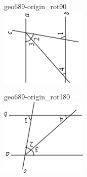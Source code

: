 \documentclass[12pt]{article}
\begin{document}
\begin{center}
\begin{minipage}{0.32\textwidth}
\end{minipage}
\hfill\begin{minipage}{0.32\textwidth}\centering
geo689-origin\_rot90\\
\includegraphics[width=0.95\linewidth]{out_rommath_origin/items/geo689-origin/assets/figure_rot90.png}
\end{minipage}
\par\medskip
\begin{minipage}{0.32\textwidth}\centering
geo689-origin\_rot180\\
\includegraphics[width=0.95\linewidth]{out_rommath_origin/items/geo689-origin/assets/figure_rot180.png}

\end{minipage}
\end{center}
\end{document}

